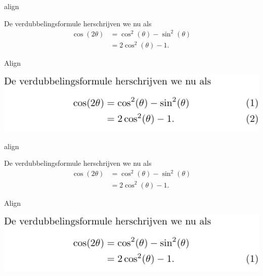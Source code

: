 \documentclass[../presentatie.tex]{subfiles}
\begin{document}
\begin{saveblock}{align}
	\begin{highlightblock}[gobble=8,linewidth=\textwidth,
		framexleftmargin=0.25em,xleftmargin=0.25em]
		De verdubbelingsformule herschrijven we nu als
		\begin{align}
			\cos(2\theta) &= \cos^2(\theta) - \sin^2(\theta)\\
			&= 2\cos^2(\theta)-1.
		\end{align}
	\end{highlightblock}
\end{saveblock}

\begin{frame}{Align}

	\includegraphics[width=\linewidth,height=0.4\textheight,keepaspectratio]{assets/5_Formules/mathAlignDoubleNumber.pdf}
\end{frame}


\begin{saveblock}{align}
	\begin{highlightblock}[gobble=8,linewidth=\textwidth,
		framexleftmargin=0.25em,xleftmargin=0.25em]
		De verdubbelingsformule herschrijven we nu als
		\begin{align}
			\cos(2\theta) &= \cos^2(\theta) - \sin^2(\theta)
			\nonumber\\
			&= 2\cos^2(\theta)-1.
		\end{align}
	\end{highlightblock}
\end{saveblock}


\begin{frame}{Align}

	\includegraphics[width=\linewidth,height=0.4\textheight,keepaspectratio]{assets/5_Formules/mathAlignSecondNumbered.pdf}
\end{frame}
\end{document}
